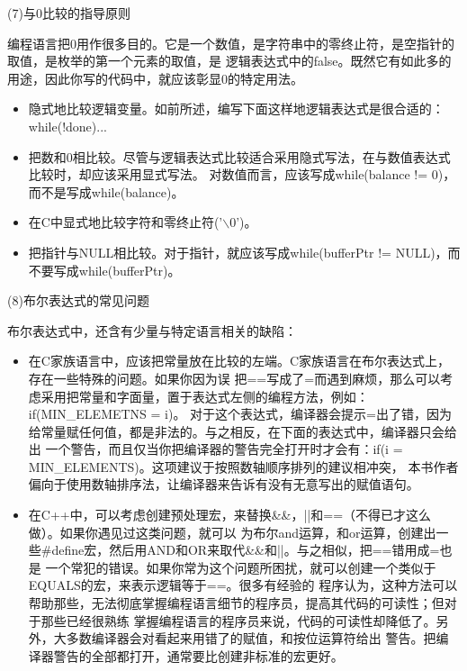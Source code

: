 \documentclass{article}
\begin{document}
\par
(7)与0比较的指导原则
\par
编程语言把0用作很多目的。它是一个数值，是字符串中的零终止符，是空指针的取值，是枚举的第一个元素的取值，是
逻辑表达式中的false。既然它有如此多的用途，因此你写的代码中，就应该彰显0的特定用法。
\begin{itemize}
    \item 隐式地比较逻辑变量。如前所述，编写下面这样地逻辑表达式是很合适的：while(!done)...
    \item 把数和0相比较。尽管与逻辑表达式比较适合采用隐式写法，在与数值表达式比较时，却应该采用显式写法。
    对数值而言，应该写成while(balance != 0)，而不是写成while(balance)。
    \item 在C中显式地比较字符和零终止符('$\backslash$0')。
    \item 把指针与NULL相比较。对于指针，就应该写成while(bufferPtr != NULL)，而不要写成while(bufferPtr)。
\end{itemize}

\par
(8)布尔表达式的常见问题
\par
布尔表达式中，还含有少量与特定语言相关的缺陷：
\begin{itemize}
    \item 在C家族语言中，应该把常量放在比较的左端。C家族语言在布尔表达式上，存在一些特殊的问题。如果你因为误
    把==写成了=而遇到麻烦，那么可以考虑采用把常量和字面量，置于表达式左侧的编程方法，例如：if(MIN\_ELEMETNS = i)。
    对于这个表达式，编译器会提示=出了错，因为给常量赋任何值，都是非法的。与之相反，在下面的表达式中，编译器只会给出
    一个警告，而且仅当你把编译器的警告完全打开时才会有：if(i = MIN\_ELEMENTS)。这项建议于按照数轴顺序排列的建议相冲突，
    本书作者偏向于使用数轴排序法，让编译器来告诉有没有无意写出的赋值语句。
    \item 在C++中，可以考虑创建预处理宏，来替换\&\&，||和==（不得已才这么做）。如果你遇见过这类问题，就可以
    为布尔and运算，和or运算，创建出一些\#define宏，然后用AND和OR来取代\&\&和||。与之相似，把==错用成=也是
    一个常犯的错误。如果你常为这个问题所困扰，就可以创建一个类似于EQUALS的宏，来表示逻辑等于==。很多有经验的
    程序认为，这种方法可以帮助那些，无法彻底掌握编程语言细节的程序员，提高其代码的可读性；但对于那些已经很熟练
    掌握编程语言的程序员来说，代码的可读性却降低了。另外，大多数编译器会对看起来用错了的赋值，和按位运算符给出
    警告。把编译器警告的全部都打开，通常要比创建非标准的宏更好。
\end{itemize}
\end{document}
